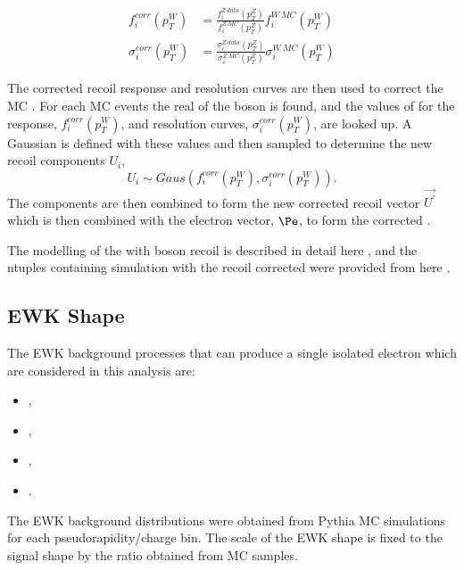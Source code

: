\begin{align}
f^{corr}_i (p^{W}_T)      
  &= \frac{ f^{Z\ data}_i (p^{Z}_T) }
          { f^{Z\ MC}_i (p^{Z}_T) }
          f^{W\ MC}_i (p^{W}_T) \\
\sigma^{corr}_i (p^{W}_T) 
  &= \frac{ \sigma^{Z\ data}_i (p^{Z}_T) }
          { \sigma^{Z\ MC}_i (p^{Z}_T) }
          \sigma^{W\ MC}_i (p^{W}_T) 
\end{align}

The corrected recoil response and resolution curves are then used to correct the
\PW \ac{MC} \ETm. For each \PW \ac{MC} events the real \pT of the boson is
found, and the values of for the response, $f^{corr}_i (p^{W}_T)$, and
resolution curves, $\sigma^{corr}_i (p^{W}_T) $, are looked up. A Gaussian is
defined with these values and then sampled to determine the new recoil
components $U_i$,
\begin{equation}
U_i \sim Gaus(f^{corr}_i (p^{W}_T), \sigma^{corr}_i (p^{W}_T) ).
\end{equation}
The components are then combined to form the new corrected recoil vector
$\vec{U^{\prime}}$ which is then combined with the electron vector, $\Pe$, to
form the corrected \ETm.

The modelling of the \HepProcess{\PW\to\Plepton\Pnu} \ETm with boson recoil is
described in detail here \cite{NULL}, and the ntuples containing
\HepProcess{\PW\to\Pelectron\Pnu} simulation with the recoil corrected \ETm were
provided from here \cite{NULL}.

\subsection{\ac{EWK} \ETm Shape}
The EWK background processes that can produce a single isolated
electron which are considered in this analysis are:
\begin{itemize}
\item \HepProcess{\PZ\to\Pelectron\APelectron},
\item \HepProcess{\PZ\to\Ptauon\APtauon},
\item \HepProcess{\PW\to\Ptau\Pnu},
\item \HepProcess{\Ptop\APtop}.
\end{itemize}

The \ac{EWK} background \ETm distributions were obtained from Pythia \ac{MC}
simulations for each pseudorapidity/charge bin.  The scale of the \ac{EWK} shape
is fixed to the signal \ETm shape by the ratio obtained from \ac{MC} samples.

